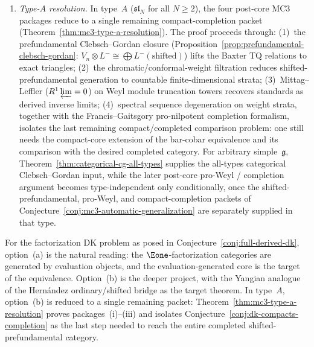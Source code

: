 \begin{remark}
\begin{enumerate}[label=\textup{(\alph*)}]
\begin{enumerate}[label=\textup{(\roman*)}]
 \textup{(}Conjecture~\textup{\ref{conj:dk-compacts-completion}}\textup{)}:
 the bar-cobar equivalence holds on the compact shifted-prefundamental
 core and extends to the completed category by
 pro-nilpotent completion in the sense of
 Francis--Gaitsgory.
 \end{enumerate}
 The natural proof order is
 $\mathfrak{sl}_2$ Baxter exact sequence
 $\to$ $\mathfrak{sl}_3$ exact triangle
 $\to$ pro-Weyl completion for one rational highest-$\ell$-weight family
 $\to$ compact generation
 $\to$ factorization/KL extension.
 The formal reductions
 \textup{(}Propositions~\textup{\ref{prop:heart-capture-criterion}}
 and~\textup{\ref{prop:standard-capture-criterion}},
 Corollary~\textup{\ref{cor:sectorwise-localizing-generation}}\textup{)}
 convert the generation problem into sectorwise control of
 standard/Weyl objects in finite truncation sectors.
\item \emph{Type-$A$ resolution.}
 In type~$A$ ($\mathfrak{sl}_N$ for all $N \geq 2$), the four
 post-core MC3 packages reduce to a single remaining
 compact-completion packet
 (Theorem~\ref{thm:mc3-type-a-resolution}).
 The proof proceeds through: (1)~the prefundamental Clebsch--Gordan
 closure
 (Proposition~\ref{prop:prefundamental-clebsch-gordan}:
 $V_n \otimes L^- \cong \bigoplus L^-(\mathrm{shifted})$) lifts the
 Baxter TQ relations to exact triangles;
 (2)~the chromatic/conformal-weight filtration reduces
 shifted-prefundamental generation to countable finite-dimensional
 strata;
 (3)~Mittag--Leffler ($R^1\varprojlim = 0$) on Weyl module
 truncation towers recovers standards as derived inverse limits;
 (4)~spectral sequence degeneration on weight strata, together
 with the Francis--Gaitsgory pro-nilpotent completion formalism,
 isolates the last remaining compact/completed comparison problem:
 one still needs the compact-core extension of the bar-cobar
 equivalence and its comparison with the desired completed
 category.
 For arbitrary simple~$\mathfrak{g}$,
 Theorem~\ref{thm:categorical-cg-all-types} supplies the
 all-types categorical Clebsch--Gordan input, while the later
 post-core pro-Weyl / completion argument becomes
 type-independent only conditionally, once the shifted-
 prefundamental, pro-Weyl, and compact-completion packets of
 Conjecture~\ref{conj:mc3-automatic-generalization} are
 separately supplied in that type.
\end{enumerate}
For the factorization DK problem as posed in
Conjecture~\ref{conj:full-derived-dk}, option~(a) is the natural
reading: the $\Eone$-factorization categories are generated by
evaluation objects, and the evaluation-generated core is the
target of the equivalence.
Option~(b) is the deeper project, with the Yangian analogue
of the Hern\'andez ordinary/shifted bridge
\cite{HerNeg24} as the target theorem.
In type~$A$, option~(b) is reduced to a single remaining packet:
Theorem~\ref{thm:mc3-type-a-resolution} proves packages~(i)--(iii)
and isolates Conjecture~\ref{conj:dk-compacts-completion} as the last
step needed to reach the entire completed shifted-prefundamental
category.
\end{remark}

